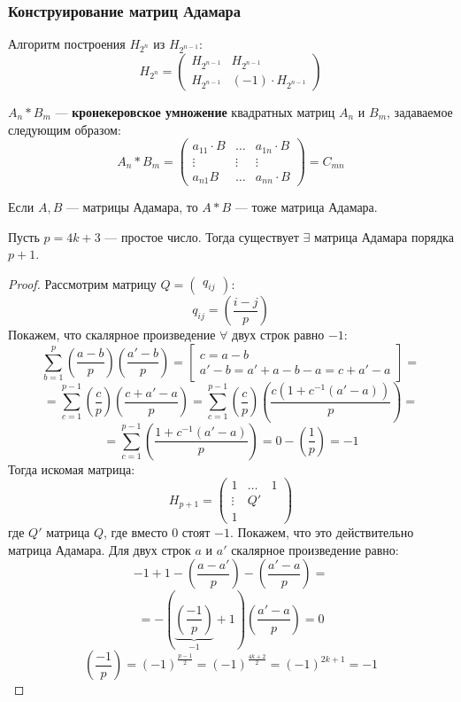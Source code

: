 \subsubsection{Конструирование матриц Адамара}
 Алгоритм построения $H_{2^{n}}$ из $H_{2^{n - 1}}$:
 \[
   H_{2^{n}} = \begin{pmatrix}H_{2^{n - 1}}  & H_{2^{n - 1}} \\ H_{2^{n - 1}} & (-1) \cdot H_{2^{n - 1}}\end{pmatrix}
 \]
 \begin{definition}
  $A_n * B_m$ --- \textbf{кронекеровское умножение} квадратных матриц $A_n$ и $B_m$, задаваемое следующим образом:
  \[
    A_n * B_m = \begin{pmatrix}a_{11} \cdot B & \ldots & a_{1n} \cdot B \\ \vdots & \vdots & \vdots \\ a_{n 1} B & \ldots & a_{n n} \cdot B\end{pmatrix} = C_{mn}
  \]
 \end{definition}
 \begin{theorem}
 \label{theorem:02_2}
  Если $A, B$ --- матрицы Адамара, то $A * B$ --- тоже матрица Адамара.
 \end{theorem}
 \begin{theorem}
 \label{theorem:02_3}
  Пусть $p = 4k + 3$ --- простое число. Тогда существует $\exists$ матрица Адамара порядка $p + 1$.
 \end{theorem}
 \begin{proof}
 Рассмотрим матрицу $Q = \begin{pmatrix}q_{ij} \end{pmatrix}$:
 \[
 q_{ij} = \left(\frac{i - j}{p}\right)
 \]
 Покажем, что скалярное произведение $\forall$ двух строк равно $-1$:
 \[
 \sum_{b = 1}^{p} \left(\frac{a - b}{p}\right) \left(\frac{a' - b}{p}\right) = \begin{bmatrix}c = a - b \\ a' - b = a' + a - b - a = c + a' - a \end{bmatrix} =
 \]
 \[
 = \sum_{c = 1}^{p - 1} \left(\frac{c}{p}\right)\left(\frac{c + a' - a}{p}\right) = \sum_{c = 1}^{p - 1} \left(\frac{c}{p}\right)\left(\frac{c(1 + c^{-1}(a' - a))}{p}\right) = 
 \]
 \[
 = \sum_{c = 1}^{p - 1} \left(\frac{1 + c^{-1}(a' - a)}{p}\right) = 0 - \left(\frac{1}{p}\right) = -1
 \]
 Тогда искомая матрица:
 \[
   H_{p + 1} = \begin{pmatrix}1 & \ldots & 1 \\ \vdots & Q'\\ 1\end{pmatrix}
 \]
  где $Q'$ матрица $Q$, где вместо $0$ стоят $-1$. Покажем, что это действительно матрица Адамара. Для двух строк $a$ и $a'$ скалярное произведение равно:
  \[
  -1 + 1 - \left(\frac{a - a'}{p}\right) - \left(\frac{a' - a}{p}\right) = 
  \]
  \[
    = -\left(\underbrace{\left(\frac{-1}{p}\right)}_{-1} + 1\right)\left(\frac{a' - a}{p}\right) = 0
  \]
  \[
  \left(\frac{-1}{p}\right) = (-1)^{\frac{p - 1}{2}} = (-1)^{\frac{4k + 2}{2}} = (-1)^{2k + 1} = -1
  \]
\end{proof}
